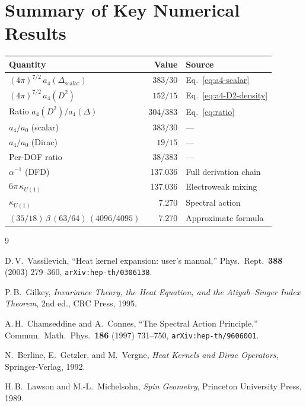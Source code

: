 \documentclass[12pt,a4paper]{article}
\theoremstyle{definition}
\begin{document}
\section{Summary of Key Numerical Results}
\label{sec:summary}

\begin{center}
\renewcommand{\arraystretch}{1.4}
\begin{tabular}{lrl}
\toprule
\textbf{Quantity} & \textbf{Value} & \textbf{Source} \\
\midrule
$(4\pi)^{7/2}\,a_4(\Delta_{\text{scalar}})$ & $383/30$ & Eq.~\eqref{eq:a4-scalar} \\
$(4\pi)^{7/2}\,a_4(D^2)$ & $152/15$ & Eq.~\eqref{eq:a4-D2-density} \\
Ratio $a_4(D^2)/a_4(\Delta)$ & $304/383$ & Eq.~\eqref{eq:ratio} \\
\midrule
$a_4/a_0$ (scalar) & $383/30$ & --- \\
$a_4/a_0$ (Dirac) & $19/15$ & --- \\
Per-DOF ratio & $38/383$ & --- \\
\midrule
$\alpha^{-1}$ (DFD) & 137.036 & Full derivation chain \\
$6\pi\,\kappa_{U(1)}$ & 137.036 & Electroweak mixing \\
$\kappa_{U(1)}$ & 7.270 & Spectral action \\
$(35/18)\,\beta\,(63/64)\,(4096/4095)$ & 7.270 & Approximate formula \\
\bottomrule
\end{tabular}
\end{center}


\begin{thebibliography}{9}

D.\,V.~Vassilevich,
``Heat kernel expansion: user's manual,''
Phys.\ Rept.\ \textbf{388} (2003) 279--360,
\texttt{arXiv:hep-th/0306138}.

P.\,B.~Gilkey,
\textit{Invariance Theory, the Heat Equation, and the Atiyah--Singer
Index Theorem}, 2nd ed., CRC Press, 1995.

A.\,H.~Chamseddine and A.~Connes,
``The Spectral Action Principle,''
Commun.\ Math.\ Phys.\ \textbf{186} (1997) 731--750,
\texttt{arXiv:hep-th/9606001}.

N.~Berline, E.~Getzler, and M.~Vergne,
\textit{Heat Kernels and Dirac Operators},
Springer-Verlag, 1992.

H.\,B.~Lawson and M.-L.~Michelsohn,
\textit{Spin Geometry},
Princeton University Press, 1989.

\end{thebibliography}
\end{document}
